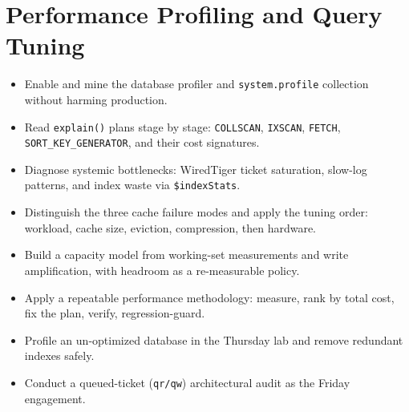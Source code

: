 \chapter{Performance Profiling and Query Tuning}
%

\begin{objectives}
\begin{itemize}
    \item Enable and mine the database profiler and \texttt{system.profile} collection without harming production.
    \item Read \texttt{explain()} plans stage by stage: \texttt{COLLSCAN}, \texttt{IXSCAN}, \texttt{FETCH}, \texttt{SORT\_KEY\_GENERATOR}, and their cost signatures.
    \item Diagnose systemic bottlenecks: WiredTiger ticket saturation, slow-log patterns, and index waste via \texttt{\$indexStats}.
    \item Distinguish the three cache failure modes and apply the tuning order: workload, cache size, eviction, compression, then hardware.
    \item Build a capacity model from working-set measurements and write amplification, with headroom as a re-measurable policy.
    \item Apply a repeatable performance methodology: measure, rank by total cost, fix the plan, verify, regression-guard.
    \item Profile an un-optimized database in the Thursday lab and remove redundant indexes safely.
    \item Conduct a queued-ticket (\texttt{qr/qw}) architectural audit as the Friday engagement.
\end{itemize}
\end{objectives}

